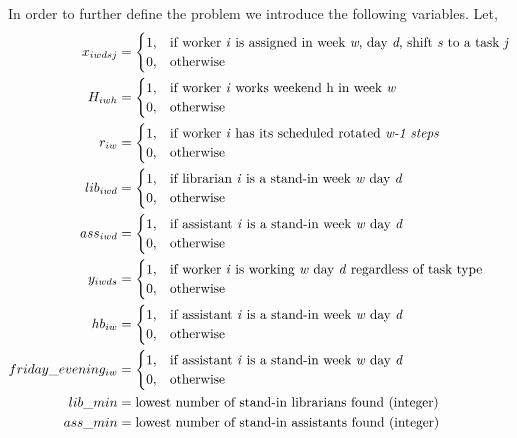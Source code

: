 In order to further define the problem we introduce the following variables. Let,
\begin{align}
    x_{iwdsj}&=
    \begin{cases}
      1, & \text{if worker \textit{i} is assigned in week \textit{w}, day \textit{d}, shift \textit{s} to a task \textit{j}}\\
      0, & \text{otherwise}
    \end{cases}
    \\
    H_{iwh}&=
    \begin{cases}
      1, & \text{if worker \textit{i} works weekend h in week \textit{w}}\\
      0, & \text{otherwise}
    \end{cases}
	\\
	r_{iw}&=
	\begin{cases}
		1, & \text{if worker \textit{i} has its scheduled rotated \textit{w-1 steps}}\\
		0, & \text{otherwise}
	\end{cases}
	\\
	lib_{iwd}&=
	\begin{cases}
	  1, & \text{if librarian \textit{i} is a stand-in week \textit{w} day \textit{d}} \\
	  0, & \text{otherwise}
	\end{cases}
	\\
	ass_{iwd}&=
	\begin{cases}
 		1, & \text{if assistant \textit{i} is a stand-in week \textit{w} day \textit{d}} \\
 		0, & \text{otherwise}
	\end{cases}
	\\
	y_{iwds}&=
	\begin{cases}
 		1, & \text{if worker \textit{i} is working \textit{w} day \textit{d} regardless of task type} \\
 		0, & \text{otherwise}
	\end{cases}
	\\
	hb_{iw}&=
	\begin{cases}
 		1, & \text{if assistant \textit{i} is a stand-in week \textit{w} day \textit{d}} \\
 		0, & \text{otherwise}
	\end{cases}
	\\
	friday\_evening_{iw}&=
	\begin{cases}
 		1, & \text{if assistant \textit{i} is a stand-in week \textit{w} day \textit{d}} \\
 		0, & \text{otherwise}
	\end{cases}	
	\\
	lib\_min&= \text{lowest number of stand-in librarians found (integer)} \\
	ass\_min&= \text{lowest number of stand-in assistants found (integer)}
\end{align}

